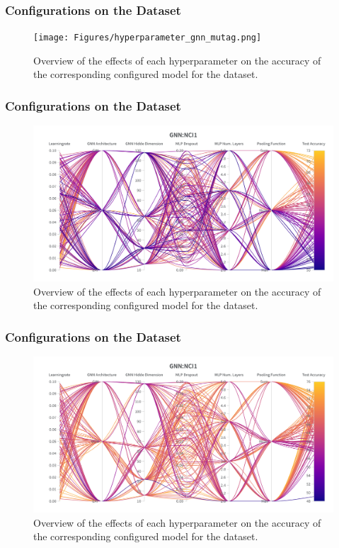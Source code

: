 \subsubsection{\gnn Configurations on the \mutag Dataset}
\begin{figure}[H]
    \centering
    \texttt{[image: Figures/hyperparameter\_gnn\_mutag.png]}
    \caption{Overview of the effects of each hyperparameter on the accuracy of the corresponding configured \gnn model for the \mutag dataset.}
\end{figure}

\subsubsection{\gnn Configurations on the \nci Dataset}
\begin{figure}[H]
    \centering
    \includegraphics[width=\textwidth, trim={0 75 0 150}, clip]{Figures/hyperparameter_gnn_nci1.png}
    \caption{Overview of the effects of each hyperparameter on the accuracy of the corresponding configured \gnn model for the \nci dataset.}
\end{figure}
\clearpage

\subsubsection{\gnn Configurations on the \proteins Dataset}
\begin{figure}[H]
    \centering
    \includegraphics[width=\textwidth, trim={0 75 0 150}, clip]{Figures/hyperparameter_gnn_proteins.png}
    \caption{Overview of the effects of each hyperparameter on the accuracy of the corresponding configured \gnn model for the \proteins dataset.}
\end{figure}

